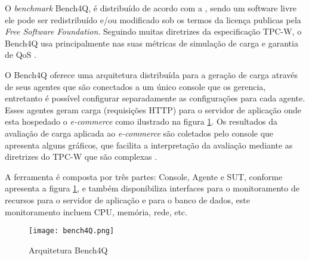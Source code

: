 O \textit{benchmark} Bench4Q, é distribuído de acordo com a , sendo um software livre ele pode ser redistribuído e/ou modificado sob os termos da licença publicas pela \textit{Free Software Foundation}. Seguindo muitas diretrizes da especificação TPC-W, o Bench4Q usa principalmente nas suas métricas de simulação de carga e garantia de QoS \cite{Bench4Q}. 

O Bench4Q oferece uma arquitetura distribuída para a geração de carga através de seus agentes que são conectados a um único console que os gerencia, entretanto é possível configurar separadamente as configurações para cada agente. Esses agentes geram carga (requisições HTTP) para o servidor de aplicação onde esta hospedado o \textit{e-commerce} como ilustrado na figura \ref{fig:arquitetura-bench4q}. Os resultados da avaliação de carga aplicada ao \textit{e-commerce} são coletados pelo console que apresenta alguns gráficos, que facilita a interpretação da avaliação mediante as diretrizes do TPC-W que são complexas \cite{Bench4Q}.

A ferramenta é composta por três partes: Console, Agente e SUT, conforme apresenta a figura \ref{fig:arquitetura-bench4q}, e também disponibiliza interfaces para o monitoramento de recursos para o servidor de aplicação e para o banco de dados, este monitoramento incluem CPU, memória, rede, etc.


\begin{figure}[htb]
	\centering
	\texttt{[image: bench4Q.png]}
	\caption{Arquitetura Bench4Q}
	\label{fig:arquitetura-bench4q}
\end{figure}


